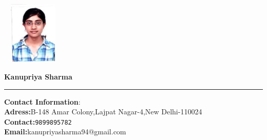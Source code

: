 \documentclass[10pt,a4paper]{article}
\begin{document}
	
\begin{flushright}
\includegraphics[width=3cm, height=3cm]{Untitled}
\end{flushright}

\textbf{\huge \bigskip Kanupriya Sharma}
\hrule
\large
\begin{flushleft}
	
	\textbf{Contact Information}:\\
	\textbf{Adress:}B-148 Amar Colony,Lajpat Nagar-4,New Delhi-110024\\
	\textbf{Contact:}\texttt{9899895782}\\
	\textbf{Email:}kanupriyasharma94@gmail.com\\ 
	
\end{flushleft}

 
\end{document}
